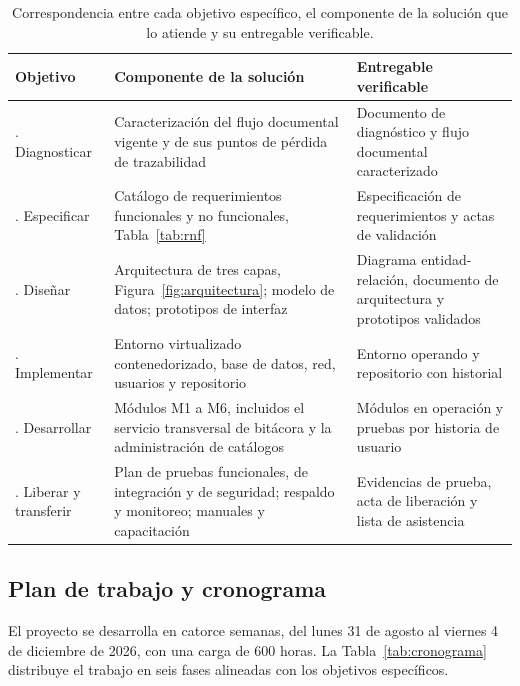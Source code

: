 \begin{table}[H]
  \centering
  \small
  \renewcommand{\arraystretch}{1.3}
  \caption{Correspondencia entre cada objetivo específico, el componente de la solución que lo atiende y su entregable verificable.}
  \label{tab:objetivo_componente}
  \begin{tabularx}{\textwidth}{@{}>{\raggedright\arraybackslash}p{2.9cm}>{\raggedright\arraybackslash}X>{\raggedright\arraybackslash}X@{}}
    \toprule
    \textbf{Objetivo} & \textbf{Componente de la solución} & \textbf{Entregable verificable} \\
    \midrule
    1. Diagnosticar & Caracterización del flujo documental vigente y de sus puntos de pérdida de trazabilidad & Documento de diagnóstico y flujo documental caracterizado \\
    2. Especificar & Catálogo de requerimientos funcionales y no funcionales, Tabla~\ref{tab:rnf} & Especificación de requerimientos y actas de validación \\
    3. Diseñar & Arquitectura de tres capas, Figura~\ref{fig:arquitectura}; modelo de datos; prototipos de interfaz & Diagrama entidad-relación, documento de arquitectura y prototipos validados \\
    4. Implementar & Entorno virtualizado contenedorizado, base de datos, red, usuarios y repositorio & Entorno operando y repositorio con historial \\
    5. Desarrollar & Módulos M1 a M6, incluidos el servicio transversal de bitácora y la administración de catálogos & Módulos en operación y pruebas por historia de usuario \\
    6. Liberar y transferir & Plan de pruebas funcionales, de integración y de seguridad; respaldo y monitoreo; manuales y capacitación & Evidencias de prueba, acta de liberación y lista de asistencia \\
    \bottomrule
  \end{tabularx}
\end{table}

\subsection{Plan de trabajo y cronograma}

El proyecto se desarrolla en catorce semanas, del lunes 31 de agosto al viernes 4 de diciembre de 2026, con una carga de 600 horas. La Tabla~\ref{tab:cronograma} distribuye el trabajo en seis fases alineadas con los objetivos específicos.

